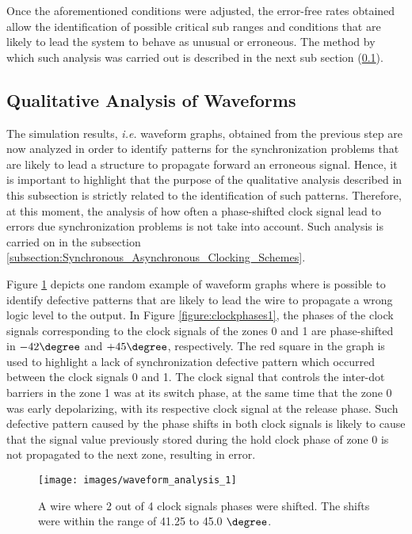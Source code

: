Once the aforementioned conditions were adjusted, the error-free rates obtained allow the identification of possible critical sub ranges and conditions that are likely to lead the system to behave as unusual or erroneous. The method by which such analysis was carried out is described in the next sub section (\ref{subsection:Qualitative_Analysis_of_Waveforms}).

\subsection{Qualitative Analysis of Waveforms}
\label{subsection:Qualitative_Analysis_of_Waveforms}

The simulation results, \textit{i.e.} waveform graphs, obtained from the previous step are now analyzed in order to identify patterns for the synchronization problems that are likely to lead a structure to propagate forward an erroneous signal. Hence, it is important to highlight that the purpose of the qualitative analysis described in this subsection is strictly related to the identification of such patterns. Therefore, at this moment, the analysis of how often a phase-shifted clock signal lead to errors due synchronization problems is not take into account. Such analysis is carried on in the subsection \ref{subsection:Synchronous_Asynchronous_Clocking_Schemes}.

Figure \ref{figure:Analysis_of_Waveforms} depicts one random example of waveform graphs where is possible to identify defective patterns that are likely to lead the wire to propagate a wrong logic level to the output. In Figure \ref{figure:clockphases1}, the phases of the clock signals corresponding to the clock signals of the zones 0 and 1 are phase-shifted in $-42 \degree$ and $+45 \degree$, respectively. The red square in the graph is used to highlight a lack of synchronization defective pattern which occurred between the clock signals 0 and 1. The clock signal that controls the inter-dot barriers in the zone 1 was at its switch phase, at the same time that the zone 0 was early depolarizing, with its respective clock signal at the release phase. Such defective pattern caused by the phase shifts in both clock signals is likely to cause that the signal value previously stored during the hold clock phase of zone 0 is not propagated to the next zone, resulting in error.

\begin{figure}[!ht]
\center
\texttt{[image: images/waveform\_analysis\_1]}
\caption{A wire where 2 out of 4 clock signals phases were shifted. The shifts were within the range of 41.25 to 45.0 $\degree$.}
\label{figure:Analysis_of_Waveforms}
\end{figure}

